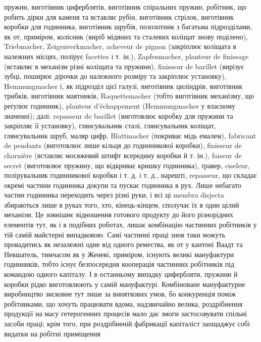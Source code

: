 \parcont{}  %
пружин, виготівник циферблятів, виготівник спіральних пружин,
робітник, що робить дірки для каменя та вставляє рубін, виготівник
стрілок, виготівник коробки для годинника, виготівник
шрубів, позолотник з багатьма підрозділами, як от, приміром,
колісник (виріб мідяних та сталевих коліщат знову поділено),
Triebmacher, Zeigenverkmacher, acheveur de pignon (закріплює
коліщата в належних місцях, полірує facettes і т. ін.), Zapfenmacher,
planteur de finissage (вставляє в механізм різні коліщата
та пружини), finisseur de barillet (вирізує зубці, поширює дірочки
до належного розміру та закріплює установку), Hemmungmacher
і, як підрозділ цієї галузі, виготівник циліндрів, виготівник
трибків, виготівник маятників, Raquettemacher (тобто виготівник
механізму, що реґулює годинник), planteur d’échappement
(Hemmungmacher у власному значенні); далі: repasseur de barillet
(виготовлює коробку для пружини та закріпляє її установку),
ґлянсувальник сталі, ґлянсувальник коліщат, ґлянсувальник
шруб, маляр цифр, Blattmacher (покриває мідь емалем),
fabricant de pendants (виготовлює лише кільця до годинникової
коробки), finisseur de charnière (вставляє мосяжевий штифт
всередину коробки й т. ін.), faiseur de secret (виготовлює пружину,
що відкриває кришку годинника), ґравер, ciseleur, полірувальник
годинникової коробки і т. д. і т. д., нарешті, repasseur, що
складає окремі частини годинника докупи та пускає годинника
в рух. Лише небагато частин годинника переходить через різні
руки, і всі ці membra disjecta збираються лише в руках того,
хто, кінець-кінцем, сполучає їх в один цілий механізм. Це
зовнішнє відношення готового продукту до його різнорідних
елементів тут, як і в подібних роботах, лишає комбінацію частинних
робітників у тій самій майстерні випадковою. Самі
частинні праці знов таки можуть провадитись як незалежні
одне від одного ремества, як от у кантоні Ваадт та Невшатель,
тимчасом як у Женеві, приміром, існують великі мануфактури
годинників, тобто існує безпосередня кооперація частинних робітників
під командою одного капіталу. І в останньому випадку
цифербляти, пружини й коробки рідко виготовлюють у самій
мануфактурі. Комбіноване мануфактурне виробництво зисковне
тут лише за виняткових умов, бо конкуренція поміж робітниками,
що хочуть працювати вдома, надзвичайно велика, роздрібнення
продукції на масу гетерогенних процесів мало дає змоги застосовувати
спільні засоби праці; крім того, при роздрібненій фабрикації
капіталіст заощаджує собі видатки на робітні приміщення
